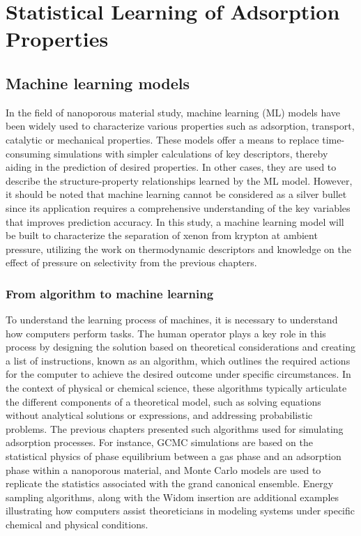 \documentclass[main]{subfiles}
\begin{document}
\chapter{Statistical Learning of Adsorption Properties}
\vspace*{-1\baselineskip}

\section{Machine learning models}

In the field of nanoporous material study, machine learning (ML) models have been widely used to characterize various properties such as adsorption, transport, catalytic or mechanical properties. These models offer a means to replace time-consuming simulations with simpler calculations of key descriptors, thereby aiding in the prediction of desired properties. In other cases, they are used to describe the structure-property relationships learned by the ML model. However, it should be noted that machine learning cannot be considered as a silver bullet since its application requires a comprehensive understanding of the key variables that improves prediction accuracy. In this study, a machine learning model will be built to characterize the separation of xenon from krypton at ambient pressure, utilizing the work on thermodynamic descriptors and knowledge on the effect of pressure on selectivity from the previous chapters.

\subsection{From algorithm to machine learning}

To understand the learning process of machines, it is necessary to understand how computers perform tasks. The human operator plays a key role in this process by designing the solution based on theoretical considerations and creating a list of instructions, known as an algorithm, which outlines the required actions for the computer to achieve the desired outcome under specific circumstances. In the context of physical or chemical science, these algorithms typically articulate the different components of a theoretical model, such as solving equations without analytical solutions or expressions, and addressing probabilistic problems. The previous chapters presented such algorithms used for simulating adsorption processes. For instance, GCMC simulations are based on the statistical physics of phase equilibrium between a gas phase and an adsorption phase within a nanoporous material, and Monte Carlo models are used to replicate the statistics associated with the grand canonical ensemble. Energy sampling algorithms, along with the Widom insertion are additional examples illustrating how computers assist theoreticians in modeling systems under specific chemical and physical conditions.
\end{document}

